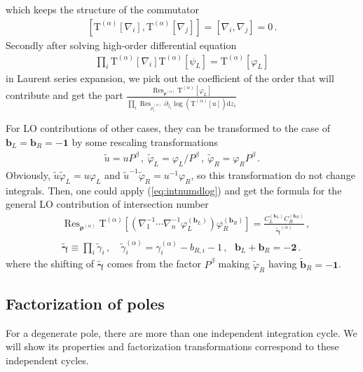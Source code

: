 \documentclass[a4paper,11pt]{article}
\newcommand{\nn}{\nonumber}
\newcommand{\nd}{\mathrm{d}}
\newcommand{\nT}{\mathrm{T}}
\def\eref#1{(\ref{#1})}
\DeclareMathOperator{\Res}{Res}
\begin{document}
which keeps the structure of the commutator
\begin{align}
\left[\nT^{(\alpha)}[\nabla_i],\nT^{(\alpha)}[\nabla_j]\right] = \left[\nabla_i,\nabla_j\right] = 0 \,.
\end{align}
Secondly after solving high-order differential equation 
\begin{align}
	\prod_i \nT^{(\alpha)}[\nabla_i] \nT^{(\alpha)}\left[\psi_L \right] = \nT^{(\alpha)}\left[\varphi_L \right] 
\end{align}
in Laurent series expansion, we pick out the coefficient of the order that will contribute and get 
the part $
\frac{\Res_{\bm{\rho}^{(\alpha)}} \nT^{(\alpha)}\left[\varphi_L \right]    }{ \prod_{i} \Res_{\rho^{(\alpha)}_i} \partial_{z_i} \log\left(\nT^{(\alpha)}\left[u \right] \right) \nd z_i }$

For LO contributions of other cases, they can be transformed to the case of $\bm{b}_L=\bm{b}_R=\bm{-1}$ by some rescaling transformations
\begin{align}
\tilde{u} = u P^\beta \,,\   \tilde{\varphi}_L = \varphi_L/P^\beta        \, , \  \tilde{\varphi}_R = \varphi_R P^\beta   \, . \label{eq:rescaling}
\end{align}
Obviously, $\tilde{u}\tilde{\varphi}_L = u \varphi_L$ and $\tilde{u}^{-1}\tilde{\varphi}_R = u^{-1} \varphi_R$, so this transformation do not change integrals.
Then, one could apply \eref{eq:intnumdlog} and get the formula for the general LO contribution of intersection number
\begin{align}
&\Res_{\bm{\rho}^{(\alpha)}} \nT^{(\alpha)}\left[   \left( \nabla_1^{-1} \cdots \nabla_n^{-1}  \varphi^{(\bm{b}_L)}_L \right)\varphi^{(\bm{b}_R)}_R \right] =
\frac{C_L^{(\bm{b}_L)} C_R^{(\bm{b}_R)}}{\tilde{\bm{\gamma}}^{(\alpha)}} \,, \nn\\
&\tilde{\bm{\gamma}}\equiv \prod_i \tilde{\gamma}_i \,, \quad \tilde{\gamma}_i^{(\alpha)} = \gamma_i^{(\alpha)} - b_{R,i} - 1  \,, \ \ \  \bm{b}_L+\bm{b}_R=\bm{-2} \,  . \label{eq:LO}
\end{align}
where the shifting of $\tilde{\bm{\gamma}}$ comes from the factor $P^\beta$ making $\tilde{\varphi}_R$ having 
$\bm{\tilde{b}}_R=\bm{-1}$.



\subsection{Factorization of poles} \label{sec:2.4}
For a degenerate pole, there are more than one independent integration cycle. We will show its properties and factorization transformations correspond to these independent cycles.
\end{document}
